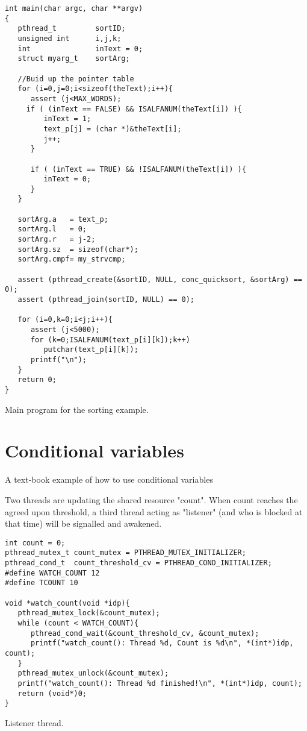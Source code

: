 \begin{table}[!hbp]
\begin{verbatim}
int main(char argc, char **argv)
{ 
   pthread_t         sortID;
   unsigned int      i,j,k;
   int               inText = 0;
   struct myarg_t    sortArg;

   //Buid up the pointer table
   for (i=0,j=0;i<sizeof(theText);i++){
      assert (j<MAX_WORDS);
     if ( (inText == FALSE) && ISALFANUM(theText[i]) ){
         inText = 1;
         text_p[j] = (char *)&theText[i];
         j++;
      }

      if ( (inText == TRUE) && !ISALFANUM(theText[i]) ){
         inText = 0;
      }
   }

   sortArg.a   = text_p;
   sortArg.l   = 0;
   sortArg.r   = j-2;
   sortArg.sz  = sizeof(char*);
   sortArg.cmpf= my_strvcmp;

   assert (pthread_create(&sortID, NULL, conc_quicksort, &sortArg) == 0);
   assert (pthread_join(sortID, NULL) == 0);

   for (i=0,k=0;i<j;i++){
      assert (j<5000);
      for (k=0;ISALFANUM(text_p[i][k]);k++)
         putchar(text_p[i][k]);
      printf("\n");
   }
   return 0;
}
\end{verbatim}
\caption{Main program for the sorting example.\label{ccsort_main}}
\end{table}

\chapter{Conditional variables}
A text-book example of how to use conditional variables

Two threads are updating the shared resource "count". When count reaches
the agreed upon threshold, a third thread acting as "listener" (and who
is blocked at that time) will be signalled and awakened.

\begin{table}[!hbp]
\begin{verbatim}
int count = 0;
pthread_mutex_t count_mutex = PTHREAD_MUTEX_INITIALIZER;
pthread_cond_t  count_threshold_cv = PTHREAD_COND_INITIALIZER;
#define WATCH_COUNT 12
#define TCOUNT 10

void *watch_count(void *idp){
   pthread_mutex_lock(&count_mutex);
   while (count < WATCH_COUNT){
      pthread_cond_wait(&count_threshold_cv, &count_mutex);
      printf("watch_count(): Thread %d, Count is %d\n", *(int*)idp, count);
   }
   pthread_mutex_unlock(&count_mutex);
   printf("watch_count(): Thread %d finished!\n", *(int*)idp, count);
   return (void*)0;
}
\end{verbatim}
\caption{Listener thread.\label{cond_watcher}}
\end{table}

